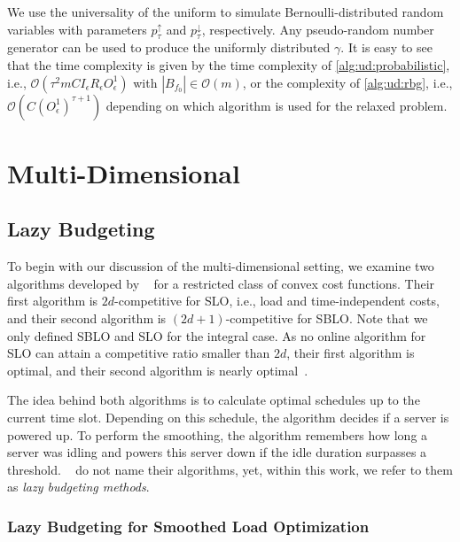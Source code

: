 We use the universality of the uniform to simulate Bernoulli-distributed random variables with parameters $p_{\tau}^{\uparrow}$ and $p_{\tau}^{\downarrow}$, respectively. Any pseudo-random number generator can be used to produce the uniformly distributed $\gamma$. It is easy to see that the time complexity is given by the time complexity of \cref{alg:ud:probabilistic}, i.e., $\mathcal{O}(\tau^2 m C I_{\epsilon} R_{\epsilon} O_{\epsilon}^1)$ with $|B_{f_0}| \in \mathcal{O}(m)$, or the complexity of \cref{alg:ud:rbg}, i.e., $\mathcal{O}(C (O_{\epsilon}^1)^{\tau+1})$ depending on which algorithm is used for the relaxed problem.

\section{Multi-Dimensional}\label{section:online_algorithms:md}

\subsection{Lazy Budgeting}\label{section:online_algorithms:md:lazy_budgeting}

To begin with our discussion of the multi-dimensional setting, we examine two algorithms developed by \citeauthor{Albers2021}~\cite{Albers2021} for a restricted class of convex cost functions. Their first algorithm is $2d$-competitive for SLO, i.e., load and time-independent costs, and their second algorithm is $(2d+1)$-competitive for SBLO. Note that we only defined SBLO and SLO for the integral case. As no online algorithm for SLO can attain a competitive ratio smaller than $2d$, their first algorithm is optimal, and their second algorithm is nearly optimal~\cite{Albers2021, Albers2021_2}.

The idea behind both algorithms is to calculate optimal schedules up to the current time slot. Depending on this schedule, the algorithm decides if a server is powered up. To perform the smoothing, the algorithm remembers how long a server was idling and powers this server down if the idle duration surpasses a threshold. \citeauthor{Albers2021}~\cite{Albers2021} do not name their algorithms, yet, within this work, we refer to them as \emph{lazy budgeting methods}.

\subsubsection{Lazy Budgeting for Smoothed Load Optimization}

